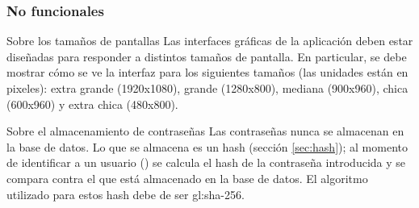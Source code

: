 %
%

\subsubsection{No funcionales}

{Sobre los tamaños de pantallas}
{
  Las interfaces gráficas de la aplicación deben estar diseñadas para
  responder a distintos tamaños de pantalla. En particular, se debe
  mostrar cómo se ve la interfaz para los siguientes tamaños (las unidades están
  en pixeles): extra grande (1920x1080), grande (1280x800), mediana (900x960),
  chica (600x960) y extra chica (480x800).
}

{Sobre el almacenamiento de contraseñas}
{
  Las contraseñas nunca se almacenan en la base de datos. Lo que se almacena es
  un hash (sección \ref{sec:hash}); al momento de identificar a un usuario
  () se calcula el hash de la
  contraseña introducida y se compara contra el que está almacenado en la base
  de datos. El algoritmo utilizado para estos hash debe de ser \gls{gl:sha}-256.
}
